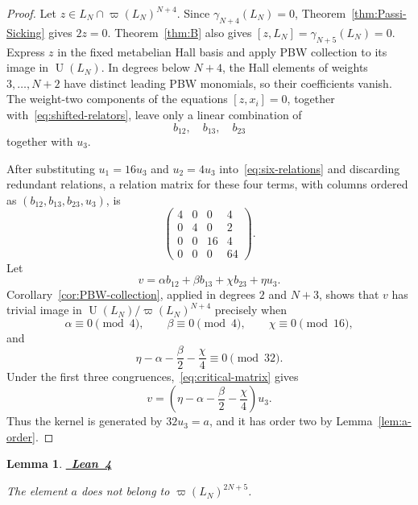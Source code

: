 \documentclass[a4paper,11pt,reqno]{amsart}
\newtheorem{lemma}[theorem]{Lemma}
\theoremstyle{definition}
\newcommand{\leanrepository}{%
  https://github.com/TimmPeterson/lie-algebras/blob/main}
\newcommand{\leanproof}[1]{%
  \leavevmode\unskip\nobreak\hfill
  \mbox{\href{#1}{\normalfont\sffamily\bfseries\footnotesize
    \textcolor{leanblue}{Lean 4}}}%
  \par\nobreak\smallskip\noindent\ignorespaces
}
\newcommand{\U}{\operatorname U}
\begin{document}
\begin{proof}
Let $z\in L_N\cap\varpi(L_N)^{N+4}$.  Since
$\gamma_{N+4}(L_N)=0$, Theorem~\ref{thm:Passi-Sicking} gives $2z=0$.
Theorem~\ref{thm:B} also gives $[z,L_N]=\gamma_{N+5}(L_N)=0$.  Express $z$
in the fixed metabelian Hall basis and apply PBW collection to its image in
$\U(L_N)$.
In degrees below $N+4$, the Hall elements of weights $3,\ldots,N+2$ have
distinct leading PBW monomials, so their coefficients vanish.  The
weight-two components of the equations $[z,x_i]=0$, together
with~\eqref{eq:shifted-relators}, leave only a linear combination of
\[
                         b_{12},\quad b_{13},\quad b_{23}
\]
together with $u_3$.

After substituting $u_1=16u_3$ and $u_2=4u_3$
into~\eqref{eq:six-relations} and discarding redundant relations, a relation
matrix for these four terms, with columns ordered as
$(b_{12},b_{13},b_{23},u_3)$, is
\begin{equation}\label{eq:critical-matrix}
 \begin{pmatrix}
  4&0&0&4\\
  0&4&0&2\\
  0&0&16&4\\
  0&0&0&64
 \end{pmatrix}.
\end{equation}
Let
\[
                 v=\alpha b_{12}+\beta b_{13}+\chi b_{23}+\eta u_3.
\]
Corollary~\ref{cor:PBW-collection}, applied in degrees $2$ and $N+3$, shows
that $v$ has trivial image in $\U(L_N)/\varpi(L_N)^{N+4}$ precisely when
\[
 \alpha\equiv0\pmod4,
 \qquad
 \beta\equiv0\pmod4,
 \qquad
 \chi\equiv0\pmod{16},
\]
and
\[
             \eta-\alpha-\frac{\beta}{2}-\frac{\chi}{4}
             \equiv0\pmod{32}.
\]
Under the first three congruences,~\eqref{eq:critical-matrix} gives
\[
 v=\left(\eta-\alpha-\frac{\beta}{2}-\frac{\chi}{4}\right)u_3.
\]
Thus the kernel is generated by $32u_3=a$, and it has order two by
Lemma~\ref{lem:a-order}.
\end{proof}

\begin{lemma}\label{lem:last-initial-form}
\leanproof{\leanrepository/LieRings/Publication/Results.lean\#L193-L203}
The element $a$ does not belong to $\varpi(L_N)^{2N+5}$.
\end{lemma}
\end{document}
